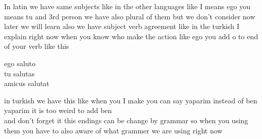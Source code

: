 In latin we have same subjects like in the other languages
like I means ego you means tu and 3rd person we have also plural of them 
but we don't consider now later we will learn also we have subject verb
agreement like in the turkish I explain right now when you know who make the action
like ego you add o to end of your verb like this
\begin{center}
ego \space saluto \\
tu \space salutas \\
amicus \space salutat\\
\end{center}
in turkish we have this like when you I make you can say yaparim instead of ben yaparim
it is too weird to add ben \\
and don't forget it this endings can be change by grammar so when you using them you
have to also aware of what grammer we are using right now
